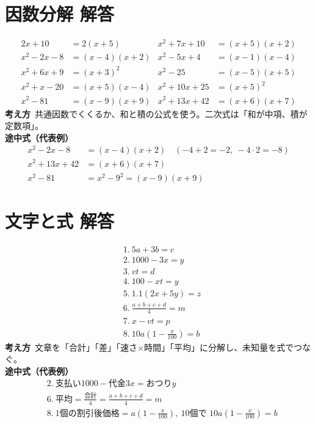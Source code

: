 \documentclass[paper=b4j,landscape,twocolumn,fleqn]{jlreq}
\begin{document}
\newpage
\section{因数分解 解答}
\begin{align*}
2x+10&=2(x+5) & x^2+7x+10&=(x+5)(x+2)\\
x^2-2x-8&=(x-4)(x+2) & x^2-5x+4&=(x-1)(x-4)\\
x^2+6x+9&=(x+3)^2 & x^2-25&=(x-5)(x+5)\\
x^2+x-20&=(x+5)(x-4) & x^2+10x+25&=(x+5)^2\\
x^2-81&=(x-9)(x+9) & x^2+13x+42&=(x+6)(x+7)
\end{align*}
\textbf{考え方}\
共通因数でくくるか、和と積の公式を使う。二次式は「和が中項、積が定数項」。\\
\textbf{途中式（代表例）}
\begin{align*}
x^2-2x-8&=(x-4)(x+2)\quad(-4+2=-2,\ -4\cdot2=-8)\\
x^2+13x+42&=(x+6)(x+7)\\
x^2-81&=x^2-9^2=(x-9)(x+9)
\end{align*}

\newpage
\section{文字と式 解答}
\begin{align*}
&1.\ 5a+3b=c\\
&2.\ 1000-3x=y\\
&3.\ vt=d\\
&4.\ 100-xt=y\\
&5.\ 1.1(2x+5y)=z\\
&6.\ \frac{a+b+c+d}{4}=m\\
&7.\ x-vt=p\\
&8.\ 10a\left(1-\frac{x}{100}\right)=b
\end{align*}
\textbf{考え方}\
文章を「合計」「差」「速さ$\times$時間」「平均」に分解し、未知量を式でつなぐ。\\
\textbf{途中式（代表例）}
\begin{align*}
&2.\ \text{支払い}1000-\text{代金}3x=\text{おつり}y\\
&6.\ \text{平均}=\frac{\text{合計}}{4}=\frac{a+b+c+d}{4}=m\\
&8.\ \text{1個の割引後価格}=a\left(1-\frac{x}{100}\right),\ \text{10個で }10a\left(1-\frac{x}{100}\right)=b
\end{align*}
\end{document}
